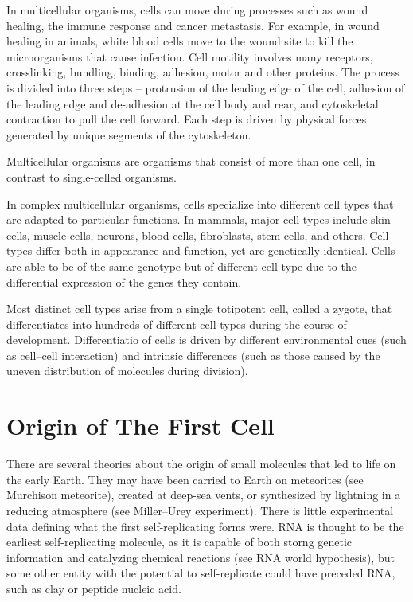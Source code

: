 In multicellular organisms, cells can move during processes such as wound healing, the immune response and cancer metastasis. For example, in wound healing in animals, white blood cells move to the wound site to kill the microorganisms that cause infection. Cell motility involves many receptors, crosslinking, bundling, binding, adhesion, motor and other proteins. The process is divided into three steps -- protrusion of the leading edge of the cell, adhesion of the leading edge and de-adhesion at the cell body and rear, and cytoskeletal contraction to pull the cell forward. Each step is driven by physical forces generated by unique segments of the cytoskeleton.

Multicellular organisms are organisms that consist of more than one cell, in contrast to single-celled organisms.

In complex multicellular organisms, cells specialize into different cell types that are adapted to particular functions. In mammals, major cell types include skin cells, muscle cells, neurons, blood cells, fibroblasts, stem cells, and others. Cell types differ both in appearance and function, yet are genetically identical. Cells are able to be of the same genotype but of different cell type due to the differential expression of the genes they contain.

Most distinct cell types arise from a single totipotent cell, called a zygote, that differentiates into hundreds of different cell types during the course of development. Differentiatio of cells is driven by different environmental cues (such as cell--cell interaction) and intrinsic differences (such as those caused by the uneven distribution of molecules during division).

\hypertarget{origin-of-the-first-cell}{%
\section{Origin of The First Cell}\label{origin-of-the-first-cell}}

There are several theories about the origin of small molecules that led to life on the early Earth. They may have been carried to Earth on meteorites (see Murchison meteorite), created at deep-sea vents, or synthesized by lightning in a reducing atmosphere (see Miller--Urey experiment). There is little experimental data defining what the first self-replicating forms were. RNA is thought to be the earliest self-replicating molecule, as it is capable of both storng genetic information and catalyzing chemical reactions (see RNA world hypothesis), but some other entity with the potential to self-replicate could have preceded RNA, such as clay or peptide nucleic acid.

